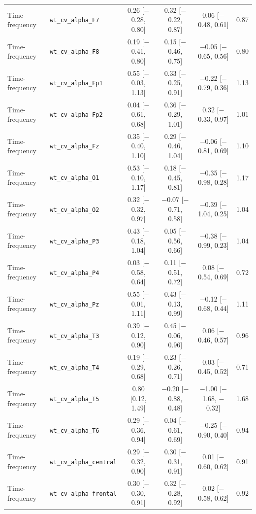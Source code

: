 {\begin{longtable}{llcccc}
Time-frequency & \texttt{wt\_cv\_alpha\_F7} & 0.26 [$-$0.28, 0.80] & 0.32 [$-$0.22, 0.87] & 0.06 [$-$0.48, 0.61] & 0.87 \\
Time-frequency & \texttt{wt\_cv\_alpha\_F8} & 0.19 [$-$0.41, 0.80] & 0.15 [$-$0.46, 0.75] & $-$0.05 [$-$0.65, 0.56] & 0.80 \\
Time-frequency & \texttt{wt\_cv\_alpha\_Fp1} & 0.55 [$-$0.03, 1.13] & 0.33 [$-$0.25, 0.91] & $-$0.22 [$-$0.79, 0.36] & 1.13 \\
Time-frequency & \texttt{wt\_cv\_alpha\_Fp2} & 0.04 [$-$0.61, 0.68] & 0.36 [$-$0.29, 1.01] & 0.32 [$-$0.33, 0.97] & 1.01 \\
Time-frequency & \texttt{wt\_cv\_alpha\_Fz} & 0.35 [$-$0.40, 1.10] & 0.29 [$-$0.46, 1.04] & $-$0.06 [$-$0.81, 0.69] & 1.10 \\
Time-frequency & \texttt{wt\_cv\_alpha\_O1} & 0.53 [$-$0.10, 1.17] & 0.18 [$-$0.45, 0.81] & $-$0.35 [$-$0.98, 0.28] & 1.17 \\
Time-frequency & \texttt{wt\_cv\_alpha\_O2} & 0.32 [$-$0.32, 0.97] & $-$0.07 [$-$0.71, 0.58] & $-$0.39 [$-$1.04, 0.25] & 1.04 \\
Time-frequency & \texttt{wt\_cv\_alpha\_P3} & 0.43 [$-$0.18, 1.04] & 0.05 [$-$0.56, 0.66] & $-$0.38 [$-$0.99, 0.23] & 1.04 \\
Time-frequency & \texttt{wt\_cv\_alpha\_P4} & 0.03 [$-$0.58, 0.64] & 0.11 [$-$0.51, 0.72] & 0.08 [$-$0.54, 0.69] & 0.72 \\
Time-frequency & \texttt{wt\_cv\_alpha\_Pz} & 0.55 [$-$0.01, 1.11] & 0.43 [$-$0.13, 0.99] & $-$0.12 [$-$0.68, 0.44] & 1.11 \\
Time-frequency & \texttt{wt\_cv\_alpha\_T3} & 0.39 [$-$0.12, 0.90] & 0.45 [$-$0.06, 0.96] & 0.06 [$-$0.46, 0.57] & 0.96 \\
Time-frequency & \texttt{wt\_cv\_alpha\_T4} & 0.19 [$-$0.29, 0.68] & 0.23 [$-$0.26, 0.71] & 0.03 [$-$0.45, 0.52] & 0.71 \\
Time-frequency & \texttt{wt\_cv\_alpha\_T5} & 0.80 [0.12, 1.49] & $-$0.20 [$-$0.88, 0.48] & $-$1.00 [$-$1.68, $-$0.32] & 1.68 \\
Time-frequency & \texttt{wt\_cv\_alpha\_T6} & 0.29 [$-$0.36, 0.94] & 0.04 [$-$0.61, 0.69] & $-$0.25 [$-$0.90, 0.40] & 0.94 \\
Time-frequency & \texttt{wt\_cv\_alpha\_central} & 0.29 [$-$0.32, 0.90] & 0.30 [$-$0.31, 0.91] & 0.01 [$-$0.60, 0.62] & 0.91 \\
Time-frequency & \texttt{wt\_cv\_alpha\_frontal} & 0.30 [$-$0.30, 0.91] & 0.32 [$-$0.28, 0.92] & 0.02 [$-$0.58, 0.62] & 0.92 \\

\end{longtable}}

